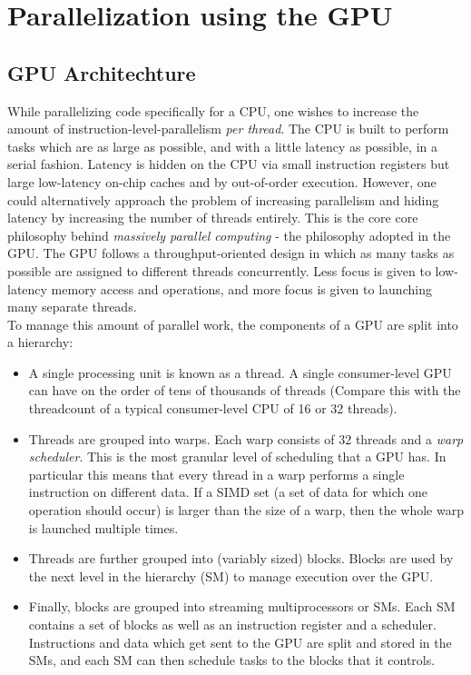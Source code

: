 \section{Parallelization using the GPU}


\subsection{GPU Architechture}

While parallelizing code specifically for a CPU, one wishes to increase the amount of 
instruction-level-parallelism \emph{per thread}. The CPU is built to perform tasks which 
are as large as possible, and with a little latency as possible, in a serial fashion. 
Latency is hidden on the CPU via small instruction registers but large low-latency on-chip 
caches and by out-of-order 
execution. However, one could alternatively approach the problem of increasing  parallelism 
and hiding latency by increasing the number of threads entirely. This is the core core 
philosophy behind \emph{massively parallel computing} - the philosophy adopted in the GPU. 
The GPU follows a throughput-oriented design in which as many tasks as possible are 
assigned to different threads concurrently. Less focus is given to low-latency memory 
access and operations, and more focus is given to launching many separate threads. \\

To manage this amount of parallel work, the components of a GPU are split into a 
hierarchy: 

\begin{itemize}
    \item A single processing unit is known as a thread. A single consumer-level GPU can 
    have on the order of tens of thousands of threads (Compare this with the threadcount 
    of a typical consumer-level CPU of 16 or 32 threads). 
    \item Threads are grouped into warps. Each warp consists of 32 threads and a 
    \emph{warp scheduler}. This is the most granular level of scheduling that a GPU has. 
    In particular this means that every thread in a warp performs a single instruction 
    on different data. If a SIMD set (a set of data for which one operation should occur) 
    is larger than the size of a warp, then the whole warp is launched multiple times. 
    \item Threads are further grouped into (variably sized) blocks. Blocks are used by 
    the next level in the hierarchy (SM) to manage execution over the GPU.
    \item Finally, blocks are grouped into streaming multiprocessors or SMs. Each SM 
    contains a set of blocks as well as an instruction register and a scheduler. Instructions 
    and data which get sent to the GPU are split and stored in the SMs, and each SM can 
    then schedule tasks to the blocks that it controls. 
\end{itemize}

